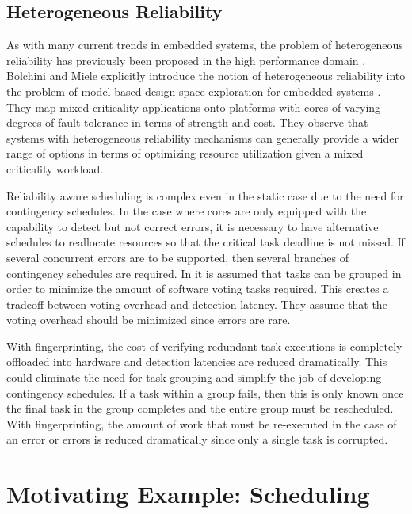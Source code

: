 \subsection{Heterogeneous Reliability}
As with many current trends in embedded systems, the problem of heterogeneous reliability has previously been proposed in the high performance domain \cite{hruby2013slower,he2003reliability,ungsunan2009improving}. Bolchini and Miele explicitly introduce the notion of heterogeneous reliability into the problem of model-based design space exploration for embedded systems \cite{bolchini2013reliability}. They map mixed-criticality applications onto platforms with cores of varying degrees of fault tolerance in terms of strength and cost. They observe that systems with heterogeneous reliability mechanisms can generally provide a wider range of options in terms of optimizing resource utilization given a mixed criticality workload.

Reliability aware scheduling is complex even in the static case due to the need for contingency schedules. In the case where cores are only equipped with the capability to detect but not correct errors, it is necessary to have alternative schedules to reallocate resources so that the critical task deadline is not missed. If several concurrent errors are to be supported, then several branches of contingency schedules are required. In \cite{bolchini2013reliability} it is assumed that tasks can be grouped in order to minimize the amount of software voting tasks required. This creates a tradeoff between voting overhead and detection latency. They assume that the voting overhead should be minimized since errors are rare. 

With fingerprinting, the cost of verifying redundant task executions is completely offloaded into hardware and detection latencies are reduced dramatically. This could eliminate the need for task grouping and simplify the job of developing contingency schedules. If a task within a group fails, then this is only known once the final task in the group completes and the entire group must be rescheduled. With fingerprinting, the amount of work that must be re-executed in the case of an error or errors is reduced dramatically since only a single task is corrupted.

\section{Motivating Example: Scheduling}
\label{s:schedulingstudy}

